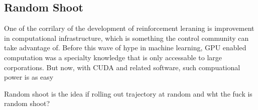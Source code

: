 \documentclass[journal]{IEEEtran}
\begin{document}
\subsection{Random Shoot}
One of the corrilary of the development of reinforcement leraning is improvement in computational infrastructure, which is something the control community can take advantage of. Before this wave of hype in machine learning, GPU enabled computation was a specialty knowledge that is only accessable to large corporations. But now, with CUDA and related software, such compuational power is as easy

Random shoot is the idea if rolling out trajectory at random and wht the fuck is random shoot?






\end{document}
